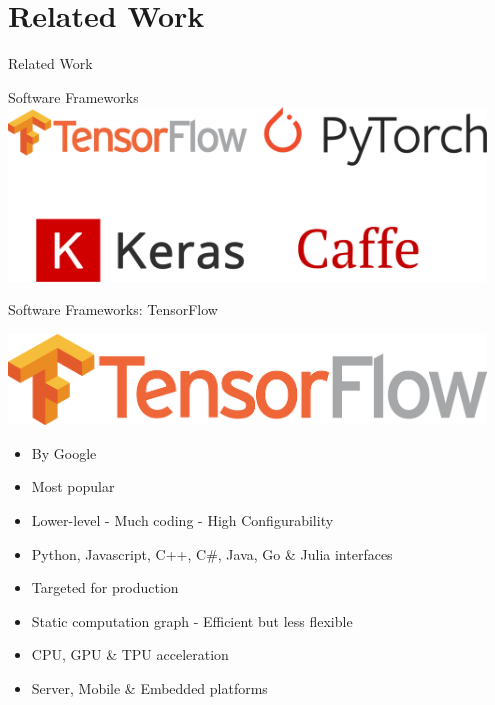 \setlength{\parskip}{\baselineskip}
\section{Related Work}

\begin{frame}
	\huge Related Work
\end{frame}

\begin{frame}
	\centering
	\huge{Software Frameworks}
	\vfill
	\includegraphics[width=0.95\textwidth]{../Images/CNNArchitectures/frameworks-logos.png}\\
\end{frame}

\begin{frame}{Software Frameworks: TensorFlow}
	\begin{minipage}{0.4\textwidth}
		\centering
		\includegraphics[width=0.95\textwidth]{../Images/CNNArchitectures/tensorflow-logo.png}\\
	\end{minipage}%
	\begin{minipage}{0.6\textwidth}
		\begin{itemize}
			\item By Google
			\item Most popular
			\item Lower-level - Much coding - High Configurability
			\item Python, Javascript, C++, C\#, Java, Go \& Julia interfaces
			\item Targeted for production
			\item Static computation graph - Efficient but less flexible
			\item CPU, GPU \& TPU acceleration
			\item Server, Mobile \& Embedded platforms
		\end{itemize}
	\end{minipage}
\end{frame}

